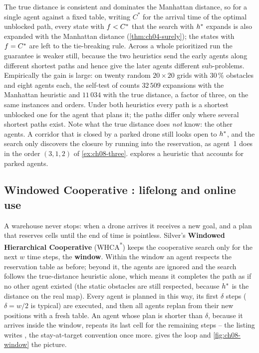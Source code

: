 The true distance is consistent and dominates the Manhattan distance, so for a single
agent against a fixed table, writing $C^*$ for the arrival time of the optimal
unblocked path, every state with $f < C^*$ that the search with
$h^*$ expands is also expanded with the Manhattan distance
(\cref{thm:ch04-surely}); the states with $f = C^*$ are left to the tie-breaking
rule. Across a whole prioritized run the guarantee is weaker still, because the two
heuristics send the early agents along different shortest paths and hence give the
later agents different sub-problems. Empirically the gain is large: on twenty random
$20 \times 20$ grids with $30\,\%$ obstacles and eight agents each, the self-test of
 counts $32\,509$ expansions with the Manhattan
heuristic and $11\,034$ with the true distance, a factor of three, on the same
instances and orders. Under both heuristics every path is a shortest unblocked one for the agent
that plans it; the paths differ only where several shortest paths exist.
Note what the true distance does \emph{not} know: the other agents. A corridor that is
closed by a parked drone still looks open to $h^*$, and the search only discovers
the closure by running into the reservation, as agent~1 does in the order $(3,1,2)$ of
\cref{ex:ch08-three}.  explores a heuristic that accounts for parked
agents.

\subsection{Windowed Cooperative \astar: lifelong and online use}
\label{sec:ch08-whca}

A warehouse never stops: when a drone arrives it receives a new goal, and a plan that
reserves cells until the end of time is pointless. Silver's \textbf{Windowed
Hierarchical Cooperative \astar} (WHCA\textsuperscript{*}) keeps the
cooperative search only for the next $w$ time steps, the \textbf{window}. Within the window an agent respects the reservation table as before; beyond
it, the agents are ignored and the search follows the true-distance heuristic alone,
which means it completes the path as if no other agent existed (the static obstacles
are still respected, because $h^*$ is the distance on the real map). Every agent is
planned in this way, its first $\delta$ steps ($\delta = w/2$ is typical) are executed,
and then all agents replan from their new positions with a fresh table. An agent whose
plan is shorter than $\delta$, because it arrives inside the window, repeats its last
cell for the remaining steps -- the listing writes
, the stay-at-target convention once
more.
 gives the loop and \cref{fig:ch08-window} the picture.

